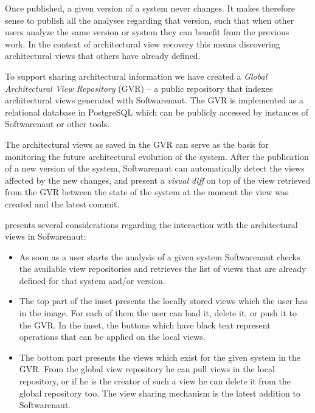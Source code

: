 \documentclass[preprint,12pt]{elsarticle}
\begin{document}



Once published, a given version of a system never changes. It makes therefore sense to publish all the analyses regarding that version, such that when other users analyze the same version or system they can benefit from the previous work. In the context of architectural view recovery this means discovering architectural views that others have already defined. 


To support sharing architectural information we have created a {\em Global Architectural View Repository} (GVR) -- a public repository that indexes architectural views generated with Softwarenaut. The GVR is implemented as a relational database in PostgreSQL which can be publicly accessed by instances of Softwarenaut or other tools. %

The architectural views as saved in the GVR can serve as the basis for monitoring the future architectural evolution of the system. After the publication of a new version of the system, Softwarenaut can automatically detect the views affected by the new changes, and present a {\em visual diff} on top of the view retrieved from the GVR between the state of the system at the moment the view was created and the latest commit.



 presents several considerations regarding the interaction with the architectural views in Sofwarenaut: 

\begin{itemize}

\item As soon as a user starts the analysis of a given system Softwarenaut checks the available view repositories and retrieves the list of views that are already defined for that system and/or version.

\item The top part of the inset presents the locally stored views which the user has in the image. For each of them the user can load it, delete it, or push it to the GVR. In the inset, the buttons which have black text represent operations that can be applied on the local views.

\item The bottom part presents the views which exist for the given system in the GVR. From the global view repository he can pull views in the local repository, or if he is the creator of such a view he can delete it from the global repository too. The view sharing mechanism is the latest addition to Softwarenaut.
\end{itemize}
\end{document}
